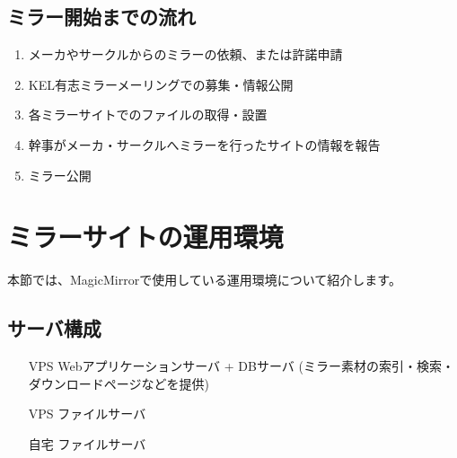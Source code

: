  

 

 

 

\subsection{ミラー開始までの流れ}

\begin{enumerate}

 \item メーカやサークルからのミラーの依頼、または許諾申請

 \item KEL有志ミラーメーリングでの募集・情報公開

 \item 各ミラーサイトでのファイルの取得・設置

 \item 幹事がメーカ・サークルへミラーを行ったサイトの情報を報告

 \item ミラー公開

\end{enumerate}

\cite{XES}

 


 

\section{ミラーサイトの運用環境}



本節では、MagicMirrorで使用している運用環境について紹介します。

 

\subsection{サーバ構成}

 

\begin{itemize}

 \item [VPS] Webアプリケーションサーバ + DBサーバ (ミラー素材の索引・検索・ダウンロードページなどを提供)

 \item [VPS] ファイルサーバ

 \item [自宅] ファイルサーバ

\end{itemize}

